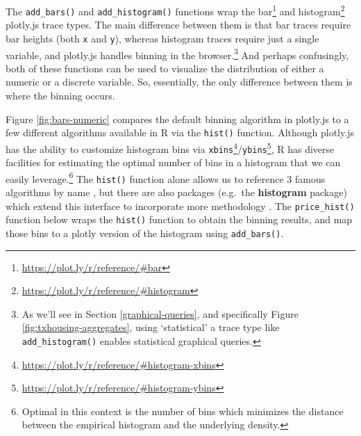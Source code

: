 \documentclass[
  12pt,
]{krantz}
\makeatletter
\renewcommand{\href}[2]{#2\footnote{\url{#1}}}
\newcommand{\indexc}[1]{\index{#1@\texttt{#1}}}
\makeatother
\begin{document}
The \texttt{add\_bars()} and \texttt{add\_histogram()} functions wrap the \href{https://plot.ly/r/reference/\#bar}{bar} and \href{https://plot.ly/r/reference/\#histogram}{histogram} plotly.js trace types. The main difference between them is that bar traces require bar heights (both \texttt{x} and \texttt{y}), whereas histogram traces require just a single variable, and plotly.js handles binning in the browser.\footnote{As we'll see in Section \ref{graphical-queries}, and specifically Figure \ref{fig:txhousing-aggregates}, using `statistical' a trace type like \texttt{add\_histogram()} enables statistical graphical queries.} And perhaps confusingly, both of these functions can be used to visualize the distribution of either a numeric or a discrete variable. So, essentially, the only difference between them is where the binning occurs.

Figure \ref{fig:bars-numeric} compares the default binning algorithm in plotly.js to a few different algorithms available in R via the \texttt{hist()} function. Although plotly.js has the ability to customize histogram bins via \href{https://plot.ly/r/reference/\#histogram-xbins}{\texttt{xbins}}/\href{https://plot.ly/r/reference/\#histogram-ybins}{\texttt{ybins}}, R has diverse facilities for estimating the optimal number of bins in a histogram that we can easily leverage.\footnote{Optimal in this context is the number of bins which minimizes the distance between the empirical histogram and the underlying density.} The \texttt{hist()} function alone allows us to reference 3 famous algorithms by name \citep{Sturges, FD, hist-scott}, but there are also packages (e.g.~the \textbf{histogram} package) which extend this interface to incorporate more methodology \citep{histogram}. The \texttt{price\_hist()} function below wraps the \texttt{hist()} function to obtain the binning results, and map those bins to a plotly version of the histogram using \texttt{add\_bars()}.

\indexc{hist()}
\end{document}
